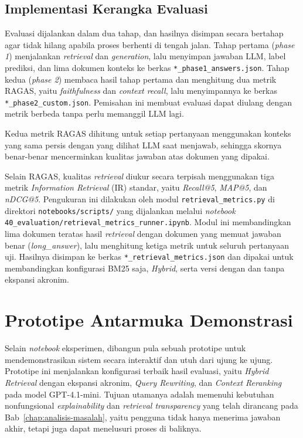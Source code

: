 \subsection{Implementasi Kerangka Evaluasi}
\label{subsec:impl-evaluasi}

Evaluasi dijalankan dalam dua tahap, dan hasilnya disimpan secara bertahap agar tidak hilang apabila proses berhenti di tengah jalan. Tahap pertama (\textit{phase 1}) menjalankan \textit{retrieval} dan \textit{generation}, lalu menyimpan jawaban LLM, label prediksi, dan lima dokumen konteks ke berkas \texttt{*\_phase1\_answers.json}. Tahap kedua (\textit{phase 2}) membaca hasil tahap pertama dan menghitung dua metrik RAGAS, yaitu \textit{faithfulness} dan \textit{context recall}, lalu menyimpannya ke berkas \texttt{*\_phase2\_custom.json}. Pemisahan ini membuat evaluasi dapat diulang dengan metrik berbeda tanpa perlu memanggil LLM lagi.

Kedua metrik RAGAS dihitung untuk setiap pertanyaan menggunakan konteks yang sama persis dengan yang dilihat LLM saat menjawab, sehingga skornya benar-benar mencerminkan kualitas jawaban atas dokumen yang dipakai.

Selain RAGAS, kualitas \textit{retrieval} diukur secara terpisah menggunakan tiga metrik \textit{Information Retrieval} (IR) standar, yaitu \textit{Recall@5}, \textit{MAP@5}, dan \textit{nDCG@5}. Pengukuran ini dilakukan oleh modul \texttt{retrieval\_metrics.py} di direktori \texttt{notebooks/scripts/} yang dijalankan melalui \textit{notebook} \texttt{40\_evaluation/retrieval\_metrics\_runner.ipynb}. Modul ini membandingkan lima dokumen teratas hasil \textit{retrieval} dengan dokumen yang memuat jawaban benar (\textit{long\_answer}), lalu menghitung ketiga metrik untuk seluruh pertanyaan uji. Hasilnya disimpan ke berkas \texttt{*\_retrieval\_metrics.json} dan dipakai untuk membandingkan konfigurasi BM25 saja, \textit{Hybrid}, serta versi dengan dan tanpa ekspansi akronim.


\section{Prototipe Antarmuka Demonstrasi}
\label{sec:impl-prototipe}

Selain \textit{notebook} eksperimen, dibangun pula sebuah prototipe untuk mendemonstrasikan sistem secara interaktif dan utuh dari ujung ke ujung. Prototipe ini menjalankan konfigurasi terbaik hasil evaluasi, yaitu \textit{Hybrid Retrieval} dengan ekspansi akronim, \textit{Query Rewriting}, dan \textit{Context Reranking} pada model GPT-4.1-mini. Tujuan utamanya adalah memenuhi kebutuhan nonfungsional \textit{explainability} dan \textit{retrieval transparency} yang telah dirancang pada Bab~\ref{chap:analisis-masalah}, yaitu pengguna tidak hanya menerima jawaban akhir, tetapi juga dapat menelusuri proses di baliknya.

